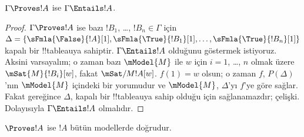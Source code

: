 \documentclass[../../../include/open-logic-section]{subfiles}
\begin{document}
\begin{cor}
$\Gamma \Proves !A$ ise $\Gamma \Entails !A$.
\end{cor}

\begin{proof}
  $\Gamma \Proves !A$ ise bazı $!B_1$, \dots, $!B_n \in \Gamma$ için
  $\Delta = \{\sFmla{\False}{!A}[1], \sFmla{\True}{!B_1}[1],
  \dots, \sFmla{\True}{!B_n}[1]\}$ kapalı bir !!{tableau}{}ya sahiptir.
  $\Gamma \Entails !A$ olduğunu göstermek istiyoruz. Aksini varsayalım; o
  zaman bazı $\mModel{M}$ ile $w$ için $i=1$, \dots, $n$ olmak üzere
  $\mSat{M}{!B_i}[w]$, fakat $\mSat/{M}{!A}[w]$. $f(1)=w$ olsun; o zaman
  $f$, $P(\Delta)$'nın $\mModel{M}$ içindeki bir yorumudur ve $\mModel{M}$,
  $\Delta$'yı $f$'ye göre sağlar. Fakat 
  gereğince $\Delta$, kapalı bir !!{tableau}{}ya sahip olduğu için sağlanamazdır;
  çelişki. Dolayısıyla $\Gamma \Entails !A$ olmalıdır.
\end{proof}

\begin{cor}
$\Proves !A$ ise $!A$ bütün modellerde doğrudur.
\end{cor}
\end{document}
